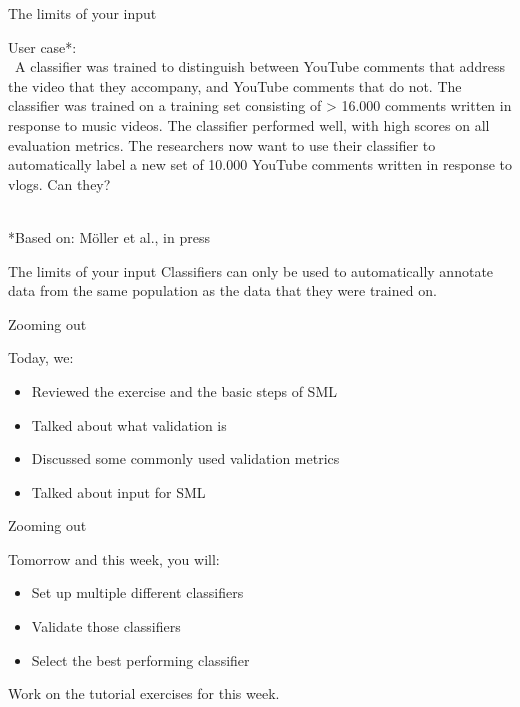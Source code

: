 \documentclass[compress]{beamer}
\begin{document}
\begin{frame}[fragile]{The limits of your input}

User case*: \\\
A classifier was trained to distinguish between YouTube comments that address the video that they accompany, and YouTube comments that do not.
\pause
The classifier was trained on a training set consisting of > 16.000 comments written in response to music videos.
\pause
The classifier performed well, with high scores on all evaluation metrics.
\pause
The researchers now want to use their classifier to automatically label a new set of 10.000 YouTube comments written in response to vlogs.
\pause
Can they? \\\

\begin{tiny}
*Based on: Möller et al., in press
\end{tiny}
\end{frame}

\begin{frame}[fragile]{The limits of your input}
Classifiers can only be used to automatically annotate data from the same population as the data that they were trained on.
\end{frame}


\begin{frame}[fragile]{Zooming out} 
	
\begin{alertblock}{Today, we:}
\begin{itemize}
	\item Reviewed the exercise and the basic steps of SML
	\item Talked about what validation is
	\item Discussed some commonly used validation metrics
	\item Talked about input for SML
\end{itemize}
\end{alertblock}
	
\end{frame}


\begin{frame}[fragile]{Zooming out} 
	
\begin{alertblock}{Tomorrow and this week, you will:}
\begin{itemize}
	\item Set up multiple different classifiers
	\item Validate those classifiers
	\item Select the best performing classifier
\end{itemize}
\end{alertblock}
	
Work on the tutorial exercises for this week. \\\
\end{frame}
\end{document}
